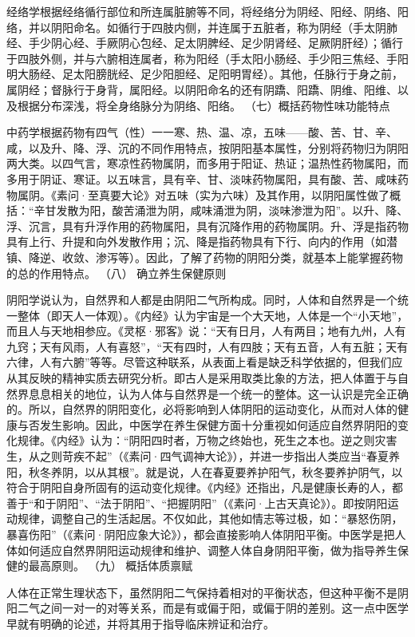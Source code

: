 \documentclass[a4paper,12pt,UTF8,twoside]{ctexbook}
\begin{document}
经络学根据经络循行部位和所连属脏腑等不同，将经络分为阴经、阳经、阴络、阳络，并以阴阳命名。如循行于四肢内侧，并连属于五脏者，称为阴经（手太阴肺经、手少阴心经、手厥阴心包经、足太阴脾经、足少阴肾经、足厥阴肝经）；循行于四肢外侧，并与六腑相连属者，称为阳经（手太阳小肠经、手少阳三焦经、手阳明大肠经、足太阳膀胱经、足少阳胆经、足阳明胃经）。其他，任脉行于身之前，属阴经；督脉行于身背，属阳经。以阴阳命名的还有阴蹻、阳蹻、阴维、阳维、以及根据分布深浅，将全身络脉分为阴络、阳络。
（七）概括药物性味功能特点

中药学根据药物有四气（性）一一寒、热、温、凉，五味——酸、苦、甘、辛、咸，以及升、降、浮、沉的不同作用特点，按阴阳基本属性，分别将药物归为阴阳两大类。以四气言，寒凉性药物属阴，而多用于阳证、热证；温热性药物属阳，而多用于阴证、寒证。以五味言，具有辛、甘、淡味药物属阳，具有酸、苦、咸味药物属阴。《素问·至真要大论》对五味（实为六味）及其作用，以阴阳属性做了概括：“辛甘发散为阳，酸苦涌泄为阴，咸味涌泄为阴，淡味渗泄为阳”。以升、降、浮、沉言，具有升浮作用的药物属阳，具有沉降作用的药物属阴。升、浮是指药物具有上行、升提和向外发散作用；沉、降是指药物具有下行、向内的作用（如潜镇、降逆、收敛、渗泻等）。因此，了解了药物的阴阳分类，就基本上能掌握药物的总的作用特点。
（八） 确立养生保健原则

阴阳学说认为，自然界和人都是由阴阳二气所构成。同时，人体和自然界是一个统一整体（即天人一体观）。《内经》认为宇宙是一个大天地，人体是一个“小天地”，而且人与天地相参应。《灵枢·邪客》说：“天有日月，人有两目；地有九州，人有九窍；天有风雨，人有喜怒”，“天有四时，人有四肢；天有五音，人有五脏；天有六律，人有六腑”等等。尽管这种联系，从表面上看是缺乏科学依据的，但我们应从其反映的精神实质去研究分析。即古人是采用取类比象的方法，把人体置于与自然界息息相关的地位，认为人体与自然界是一个统一的整体。这一认识是完全正确的。所以，自然界的阴阳变化，必将影响到人体阴阳的运动变化，从而对人体的健康与否发生影响。因此，中医学在养生保健方面十分重视如何适应自然界阴阳的变化规律。《内经》认为：“阴阳四时者，万物之终始也，死生之本也。逆之则灾害生，从之则苛疾不起”（《素问·四气调神大论》），并进一步指出人类应当“春夏养阳，秋冬养阴，以从其根”。就是说，人在春夏要养护阳气，秋冬要养护阴气，以符合于阴阳自身所固有的运动变化规律。《内经》还指出，凡是健康长寿的人，都善于“和于阴阳”、“法于阴阳”、“把握阴阳”（《素问·上古天真论》）。即按阴阳运动规律，调整自己的生活起居。不仅如此，其他如情志等过极，如：“暴怒伤阴，暴喜伤阳”（《素问·阴阳应象大论》），都会直接影响人体阴阳平衡。中医学是把人体如何适应自然界阴阳运动规律和维护、调整人体自身阴阳平衡，做为指导养生保健的最高原则。
（九） 概括体质禀赋

人体在正常生理状态下，虽然阴阳二气保持着相对的平衡状态，但这种平衡不是阴阳二气之间一对一的对等关系，而是有或偏于阳，或偏于阴的差别。这一点中医学早就有明确的论述，并将其用于指导临床辨证和治疗。
\end{document}
